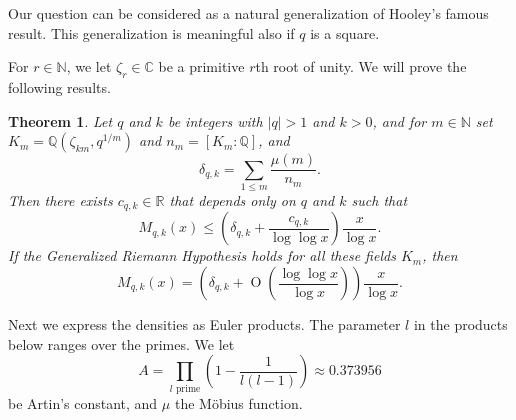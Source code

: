 \documentclass[twoside,final,reqno,noamsfonts]{birkartspecial}
\newtheorem{theorem}{Theorem}[section]
\begin{document}
Our question can be considered as a natural generalization
of Hooley's famous result. This generalization is meaningful
also if $q$ is a square.

For $r \in {\mathbb N}$, we let
$\zeta_r \in {\mathbb C} $
be a primitive $r$th root of unity.
We will prove the following results.

\begin{theorem} Let $q$ and $k$ be  integers with $|q|> 1$
and $ k>0$,   and  for $m\in
{\mathbb N}$
set $K_m={\mathbb Q}(\zeta_{km},q^{1/m})$  and
$n_{m}=\left[K_m:{\mathbb Q}\right]$,
and
$$\delta_{q,k}=\sum_{1\le m}\frac{\mu(m)}{n_m}.$$
Then there exists  $c_{q,k} \in {\mathbb R}$
that depends only on $q$ and $k$ such that
$$M_{q,k}(x)\leq\left(\delta_{q,k}+\frac{c_{q,k}}{\log\log x}\right)
\frac{x}{\log x}.$$
If the Generalized Riemann Hypothesis holds for all these fields $K_m$,
then
$$M_{q,k}(x)=\left(\delta_{q,k}+\operatorname{O}\left(\frac{\log\log x}{\log x}\right) %
\right)\frac{x}{\log x}.$$
\end{theorem}

Next we express the densities as Euler products.
The parameter $l$ in the products below ranges over the primes. We
let $$A = \displaystyle{\prod_{l \text{ prime}}} (1 - \frac{1}{l(l-1)})
\approx 0.373956$$
be Artin's constant, and $\mu$ the M\"obius function.
\end{document}
